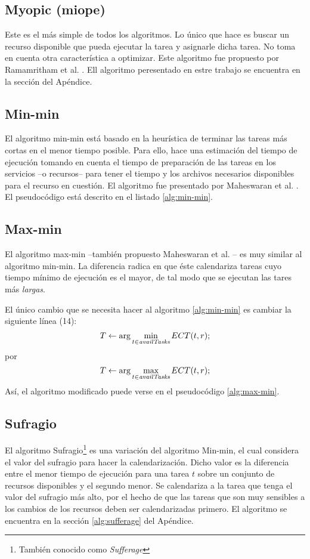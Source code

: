 \subsection{Myopic (miope)}
Este es el más simple de todos los algoritmos. Lo único que hace es buscar un recurso disponible que pueda ejecutar la tarea y asignarle dicha tarea. No toma en cuenta otra característica a optimizar. Este algoritmo fue propuesto por Ramamritham et al. \cite{ramamritham1990efficient}. Ell algoritmo \cite{yu2008workflow} peresentado en estre trabajo se encuentra en la sección \cite{alg:myopic} del Apéndice.

\subsection{Min-min}
El algoritmo min-min está basado en la heurística de terminar las tareas más cortas en el menor tiempo posible. Para ello, hace una estimación del tiempo de ejecución tomando en cuenta el tiempo de preparación de las tareas en los servicios --o recursos-- para tener el tiempo y los archivos necesarios disponibles para el recurso en cuestión. El algoritmo fue presentado por Maheswaran et al. \cite{maheswaran1999dynamic}. El pseudocódigo está descrito en el listado \ref{alg:min-min}.

\subsection{Max-min}
El algoritmo max-min --también propuesto Maheswaran et al. \cite{maheswaran1999dynamic}-- es muy similar al algoritmo min-min. La diferencia radica en que éste calendariza tareas cuyo tiempo mínimo de ejecución es el mayor, de tal modo que se ejecutan las tares más \emph{largas}.

El único cambio que se necesita hacer al algoritmo \ref{alg:min-min} es cambiar la siguiente línea (14):
\[T \leftarrow \arg\min_{t \in \emph{availTasks}}ECT(t,r);\]
por
\[T \leftarrow \arg\max_{t \in \emph{availTasks}}ECT(t,r);\]
Así, el algoritmo modificado puede verse en el pseudocódigo \ref{alg:max-min}.

\subsection{Sufragio}
El algoritmo Sufragio\footnote{También conocido como \emph{Sufferage}} \cite{maheswaran1999dynamic} es una variación del algoritmo Min-min, el cual considera el valor del sufragio para hacer la calendarización. Dicho valor es la diferencia entre el menor tiempo de ejecución para una tarea $t$ sobre un conjunto de recursos disponibles y el segundo menor. Se calendariza a la tarea que tenga el valor del sufragio más alto, por el hecho de que las tareas que son muy sensibles a los cambios de los recursos deben ser calendarizadas primero. El algoritmo se encuentra en la sección \ref{alg:sufferage} del Apéndice.



